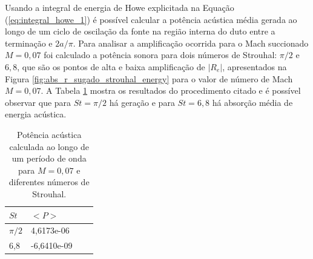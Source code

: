\begin{figure}[ht!]
\centering
  
\end{figure}

Usando a integral de energia de Howe explicitada na Equação (\ref{eq:integral_howe_1}) é possível calcular a potência acústica média gerada ao longo de um ciclo de oscilação da fonte na região interna do duto entre a terminação e $2a/\pi$. Para analisar a amplificação ocorrida para o Mach succionado $M = 0,07$ foi calculado a potência sonora para dois números de Strouhal: $\pi/2$ e $6,8$, que são os pontos de alta e baixa amplificação de $|R_{e}|$, apresentados na Figura \ref{fig:abs_r_sugado_strouhal_energy} para o valor de número de Mach $M = 0,07$. A Tabela \ref{table:potencia} mostra os resultados do procedimento citado e é possível observar que para $St = \pi/2$ há geração e para $St = 6,8$ há absorção média de energia acústica. 

\begin{table}[ht!]
\centering
\caption{Potência acústica calculada ao longo de um período de onda para $M = 0,07$ e diferentes números de Strouhal.}
\label{table:potencia}
    \begin{tabular}{|l|l|l|l|}
        \hline
        $St$ & $<P>$ \\ \hline
        $\pi/2$ & 4,6173e-06  \\ \hline  
        6,8 & -6,6410e-09 \\ \hline
    \end{tabular}
\end{table}

